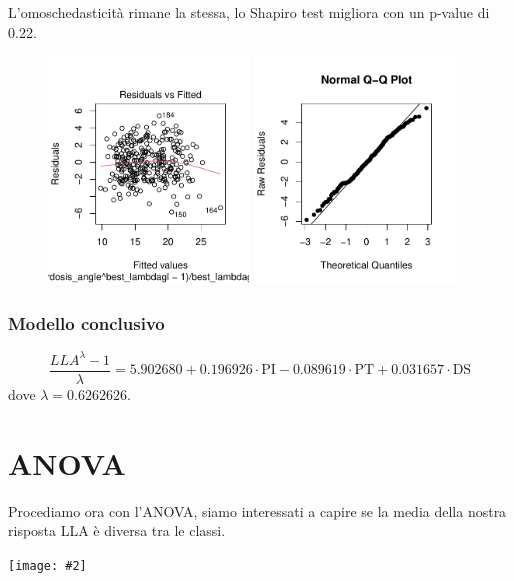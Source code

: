 \documentclass{beamer}
\newcommand{\fg}[2]{%
  \begin{center}
      \texttt{[image: \#2]}%
  \end{center}
}
\begin{document}
\begin{frame}
	L'omoschedasticità rimane la stessa, lo Shapiro test migliora con un p-value di 0.22.
	\begin{figure}
	   \includegraphics[width=0.475\textwidth]{12omoschedasticita}
	   \hfill
	   \includegraphics[width=0.475\textwidth]{13qqplot}
	\end{figure}
\end{frame}

\begin{frame}
	\frametitle{Modello conclusivo}
	$$
	\frac{LLA^{\lambda}-1}{\lambda} = 5.902680 + 0.196926 \cdot \text{PI} -0.089619 \cdot \text{PT} + 0.031657 \cdot \text{DS}
	$$
	dove $\lambda=0.6262626$.
\end{frame}






\section{ANOVA}

\begin{frame}
	Procediamo ora con l'ANOVA, siamo interessati a capire se la media della nostra risposta LLA è diversa tra le classi.
	\fg{0.6}{14boxplot}
\end{frame}
\end{document}
